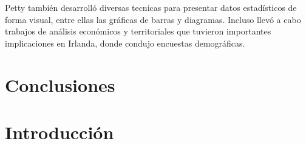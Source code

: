 \documentclass[12pt, a4paper]{article}
\begin{document}
Petty también desarrolló diversas tecnicas para presentar datos estadísticos de forma visual, entre ellas las gráficas de barras y diagramas. Incluso llevó a cabo trabajos de análisis económicos y territoriales que tuvieron importantes implicaciones en Irlanda, donde condujo encuestas demográficas.



\section{Conclusiones}

\section{Introducción}
\end{document}

